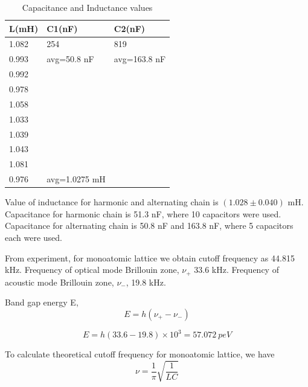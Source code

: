 \documentclass[a4paper, amsfonts, amssymb, amsmath, reprint, showkeys, nofootinbib, twoside]{revtex4-1}
\begin{document}
\begin{table}[H]
	\centering
	\caption{Capacitance and Inductance values}
	\label{t2}
		\begin{tabular}{|l|ll|}
			\hline
			L(mH) & \multicolumn{1}{l|}{C1(nF)}        & C2(nF)       \\ \hline
			1.082 & \multicolumn{1}{l|}{254}           & 819          \\ \hline
			0.993 & \multicolumn{1}{l|}{avg=50.8 nF}   & avg=163.8 nF \\ \hline
			0.992 & \multicolumn{2}{l|}{\multirow{7}{*}{}}            \\ \cline{1-1}
			0.978 & \multicolumn{2}{l|}{}                             \\ \cline{1-1}
			1.058 & \multicolumn{2}{l|}{}                             \\ \cline{1-1}
			1.033 & \multicolumn{2}{l|}{}                             \\ \cline{1-1}
			1.039 & \multicolumn{2}{l|}{}                             \\ \cline{1-1}
			1.043 & \multicolumn{2}{l|}{}                             \\ \cline{1-1}
			1.081 & \multicolumn{2}{l|}{}                             \\ \hline
			0.976 & \multicolumn{1}{l|}{avg=1.0275 mH} &              \\ \hline
		\end{tabular}
\end{table}

Value of inductance for harmonic and alternating chain is $(1.028\pm0.040)$ mH. Capacitance for harmonic chain is 51.3 nF, where 10 capacitors were used. Capacitance for alternating chain is 50.8 nF and 163.8 nF, where 5 capacitors each were used.

From experiment, for monoatomic lattice we obtain cutoff frequency as 44.815 kHz. Frequency of optical mode Brillouin zone, $\nu_+$ 33.6 kHz. Frequency of acoustic mode Brillouin zone, $\nu_-$, 19.8 kHz.

Band gap energy E,
\begin{equation}
	E=h(\nu_+-\nu_-)
\end{equation}

\begin{equation}
	E=h(33.6-19.8)\times10^{3}=57.072 ~peV
\end{equation}

To calculate theoretical cutoff frequency for monoatomic lattice, we have
\begin{equation}
	\nu=\frac{1}{\pi}\sqrt{\frac{1}{LC}}
\end{equation}
\end{document}
